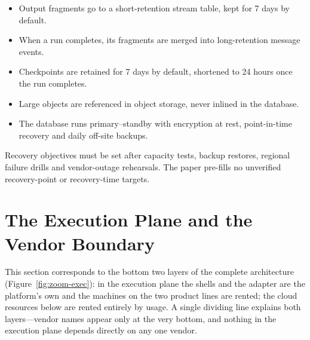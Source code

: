 \begin{itemize}
  \item Output fragments go to a short-retention stream table, kept for 7 days by default.
  \item When a run completes, its fragments are merged into long-retention message events.
  \item Checkpoints are retained for 7 days by default, shortened to 24 hours once the run completes.
  \item Large objects are referenced in object storage, never inlined in the database.
  \item The database runs primary–standby with encryption at rest, point-in-time recovery and daily off-site backups.
\end{itemize}

Recovery objectives must be set after capacity tests, backup restores, regional failure drills and vendor-outage rehearsals. The paper pre-fills no unverified recovery-point or recovery-time targets.

\section{The Execution Plane and the Vendor Boundary}
\label{sec:execplane}

This section corresponds to the bottom two layers of the complete architecture (Figure~\ref{fig:zoom-exec}): in the execution plane the shells and the adapter are the platform's own and the machines on the two product lines are rented; the cloud resources below are rented entirely by usage. A single dividing line explains both layers---vendor names appear only at the very bottom, and nothing in the execution plane depends directly on any one vendor.

